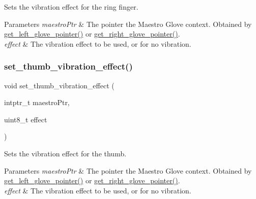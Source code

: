 Sets the vibration effect for the ring finger. 
\begin{DoxyParams}{Parameters}
{\em maestro\+Ptr} & The pointer the Maestro Glove context. Obtained by \hyperlink{group__glove_management_ga63ce3c99d4a8b8db851b22af9185764e}{get\+\_\+left\+\_\+glove\+\_\+pointer()} or \hyperlink{group__glove_management_ga9b8fd9d91aeac3f8da50f7a7eba0c32b}{get\+\_\+right\+\_\+glove\+\_\+pointer()}. \\
\hline
{\em effect} & The vibration effect to be used, or {} for no vibration. \\
\hline
\end{DoxyParams}
\mbox{\label{group__vibration_control_ga2cade8fb792cc25e14176898ba9b70d5}} 
\subsubsection{\texorpdfstring{set\+\_\+thumb\+\_\+vibration\+\_\+effect()}{set\_thumb\_vibration\_effect()}}
{\footnotesize\ttfamily void set\+\_\+thumb\+\_\+vibration\+\_\+effect (\begin{DoxyParamCaption}\item[{intptr\+\_\+t}]{maestro\+Ptr,  }\item[{uint8\+\_\+t}]{effect }\end{DoxyParamCaption})}

Sets the vibration effect for the thumb. 
\begin{DoxyParams}{Parameters}
{\em maestro\+Ptr} & The pointer the Maestro Glove context. Obtained by \hyperlink{group__glove_management_ga63ce3c99d4a8b8db851b22af9185764e}{get\+\_\+left\+\_\+glove\+\_\+pointer()} or \hyperlink{group__glove_management_ga9b8fd9d91aeac3f8da50f7a7eba0c32b}{get\+\_\+right\+\_\+glove\+\_\+pointer()}. \\
\hline
{\em effect} & The vibration effect to be used, or {} for no vibration. \\
\hline
\end{DoxyParams}
